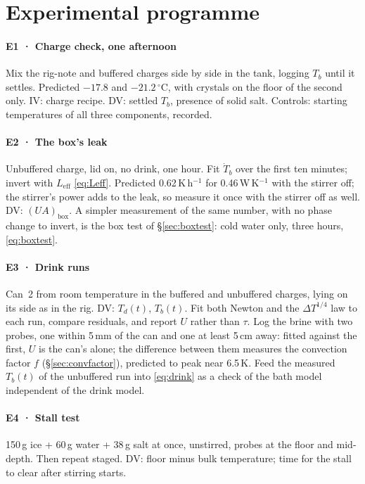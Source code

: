 \documentclass[11pt,a4paper]{article}
\newcommand{\dC}{\,^{\circ}\mathrm{C}}
\begin{document}
\section{Experimental programme}
\label{sec:experiments}

\paragraph{E1 · Charge check, one afternoon} Mix the rig-note and buffered charges side by side
in the tank, logging $T_b$ until it settles. Predicted $-17.8$ and $-21.2\dC$, with crystals on
the floor of the second only. IV: charge recipe. DV: settled $T_b$, presence of solid salt.
Controls: starting temperatures of all three components, recorded.

\paragraph{E2 · The box's leak} Unbuffered charge, lid on, no drink, one hour. Fit
$\dot T_b$ over the first ten minutes; invert with $L_{\text{eff}}$ \eqref{eq:Leff}. Predicted
0.62\,K\,h$^{-1}$ for 0.46\,W\,K$^{-1}$ with the stirrer off; the stirrer's power adds to the leak, so
measure it once with the stirrer off as well. DV: $(UA)_{\text{box}}$. A simpler measurement of the
same number, with no phase change to invert, is the box test of §\ref{sec:boxtest}: cold water only,
three hours, \eqref{eq:boxtest}.

\paragraph{E3 · Drink runs} Can~2 from room temperature in the buffered and unbuffered charges, lying
on its side as in the rig. DV: $T_d(t)$, $T_b(t)$. Fit both Newton and the $\Delta T^{1/4}$ law to
each run, compare residuals, and report $U$ rather than $\tau$. Log the brine with two probes, one
within 5\,mm of the can and one at least 5\,cm away: fitted against the first, $U$ is the can's alone;
the difference between them measures the convection factor $f$ (§\ref{sec:convfactor}), predicted to
peak near 6.5\,K. Feed the measured $T_b(t)$ of the unbuffered run into \eqref{eq:drink} as a check of
the bath model independent of the drink model.

\paragraph{E4 · Stall test} 150\,g ice + 60\,g water + 38\,g salt at once, unstirred, probes at
the floor and mid-depth. Then repeat staged. DV: floor minus bulk temperature; time for the stall
to clear after stirring starts.
\end{document}
